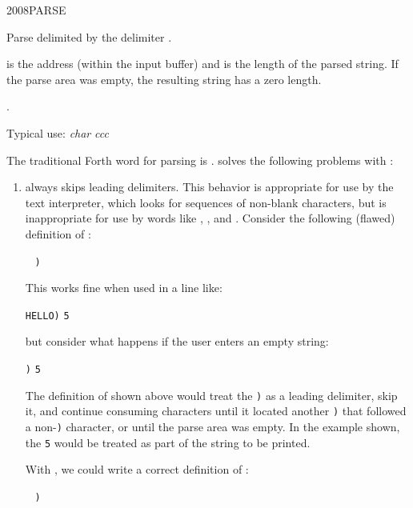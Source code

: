 \begin{worddef}{2008}{PARSE}
\item {}

	Parse  delimited by the delimiter .

	 is the address (within the input buffer) and
	 is the length of the parsed string. If the parse area
	was empty, the resulting string has a zero length.

\see {}.

	\begin{defer}
	\rationale %
		Typical use: \emph{char}  \emph{ccc}

		The traditional Forth word for parsing is .
		 solves the following problems with :

		\begin{enumerate}
		\item {} always skips leading delimiters. This
			behavior is appropriate for use by the text interpreter,
			which looks for sequences of non-blank characters, but is
			inappropriate for use by words like  , ,
			and . Consider the following (flawed) definition
			of :

			\tab \word{:}  ~
				\word{[CHAR]} \texttt{)} ~
				  
			\word{;} ~ 

			This works fine when used in a line like:

			\tab {} \texttt{HELLO)} \quad \texttt{5} 

			but consider what happens if the user enters an empty
			string:

			\tab {} \texttt{)} \quad \texttt{5} 

			The definition of  shown above would treat the
			\texttt{)} as a leading delimiter, skip it, and continue
			consuming characters until it located another \texttt{)}
			that followed a non-\texttt{)} character, or until the
			parse area was empty. In the example shown, the
			\texttt{5} 
			would be treated as part of the string to be printed.

			With , we could write a correct definition of
			:

			\tab \word{:}  ~
				\word{[CHAR]} \texttt{)} ~
				 
			\word{;} ~ 


\end{enumerate}
\end{defer}
\end{worddef}
